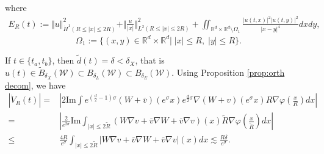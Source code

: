 \documentclass[reqno, 11pt]{amsart}
\numberwithin{equation}{section}
\newcommand{\R}{\mathbb{R}}
\theoremstyle{plain}
\theoremstyle{definition}
\numberwithin{equation}{section}
\numberwithin{theorem}{section}
\numberwithin{equation}{section}
\renewcommand{\Im}{\mathrm{Im}}
\numberwithin{equation}{section}
\numberwithin{theorem}{section}
\begin{document}
	where
	\begin{equation*}
	\begin{aligned}
	E_R(t):=\Vert u \Vert_{\dot H^1(R\leq|x|\leq 2R)}^2+\Vert \frac{u}{|x|} \Vert_{L^2(R\leq|x|\leq 2R)}^2+\iint_{\R^d\times \R^d \setminus \varOmega_1} \frac{\big|u(t,x)\big|^2\big|u(t,y)\big|^2}{|x-y|^4} dxdy,
	\end{aligned}
	\end{equation*}
	\begin{equation*}
	\varOmega_1:=\{(x,y)\in\R^d\times\R^d|\;|x|\leq R,\;|y|\leq R \}.
	\end{equation*}
	
	If $t\in\{ t_a,t_b \}$, then $\widetilde{d}(t)=\delta<\delta_{X}$, that is $u(t)\in \widetilde{B}_{\delta_{X}}(\mathcal{W})\subset B_{\delta_{L}}(\mathcal{W})\subset B_{\delta_{E}}(\mathcal{W})$. Using Proposition \ref{prop:orth decom}, we have
	\begin{equation}\label{est:V 1deri bd}
	\begin{aligned}
	|\dot{V}_R(t)|=&|2\Im \int e^{(\frac{d}{2}-1)\sigma} (W+\bar{v})(e^{\sigma}x)e^{\frac{d}{2}\sigma}\nabla(W+v)(e^{\sigma}x)R\nabla\varphi(\frac{x}{R})dx|\\=&|\frac{2}{e^{2\sigma}}\Im \int_{|x|\leq2\widetilde{R}}\left( W\nabla v+\bar{v}\nabla W+\bar{v}\nabla v \right)(x)\widetilde{R} \nabla\varphi(\frac{x}{\widetilde{R}})dx|\\ \leq& \frac{4R}{e^{\sigma}} \int_{|x|\leq2\widetilde{R}}|W\nabla v+\bar{v}\nabla W+\bar{v}\nabla v|(x)dx\lesssim \frac{R\delta}{e^{\sigma}}.
	\end{aligned}
	\end{equation}
	
\end{document}
